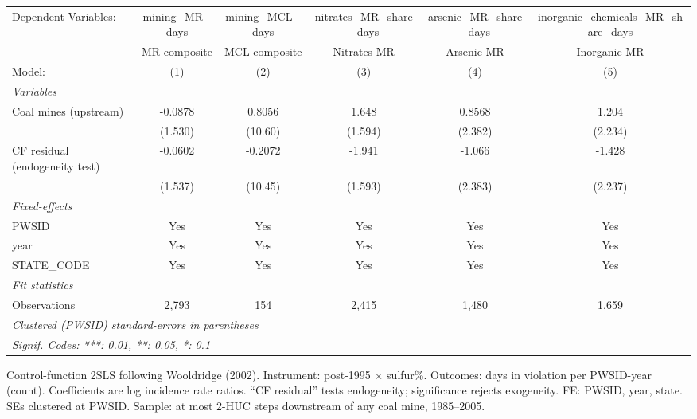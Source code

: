 
\begingroup
\centering
\begin{tabular}{lccccc}
   \tabularnewline \midrule \midrule
   Dependent Variables:           & mining\_MR\_days   & mining\_MCL\_days   & nitrates\_MR\_share\_days    & arsenic\_MR\_share\_days    & inorganic\_chemicals\_MR\_share\_days\\      
                                  & MR composite       & MCL composite       & Nitrates MR                  & Arsenic MR                  & Inorganic MR \\   
   Model:                         & (1)                & (2)                 & (3)                          & (4)                         & (5)\\  
   \midrule
   \emph{Variables}\\
   Coal mines (upstream)          & -0.0878            & 0.8056              & 1.648                        & 0.8568                      & 1.204\\   
                                  & (1.530)            & (10.60)             & (1.594)                      & (2.382)                     & (2.234)\\   
   CF residual (endogeneity test) & -0.0602            & -0.2072             & -1.941                       & -1.066                      & -1.428\\   
                                  & (1.537)            & (10.45)             & (1.593)                      & (2.383)                     & (2.237)\\   
   \midrule
   \emph{Fixed-effects}\\
   PWSID                          & Yes                & Yes                 & Yes                          & Yes                         & Yes\\  
   year                           & Yes                & Yes                 & Yes                          & Yes                         & Yes\\  
   STATE\_CODE                    & Yes                & Yes                 & Yes                          & Yes                         & Yes\\  
   \midrule
   \emph{Fit statistics}\\
   Observations                   & 2,793              & 154                 & 2,415                        & 1,480                       & 1,659\\  
   \midrule \midrule
   \multicolumn{6}{l}{\emph{Clustered (PWSID) standard-errors in parentheses}}\\
   \multicolumn{6}{l}{\emph{Signif. Codes: ***: 0.01, **: 0.05, *: 0.1}}\\
\end{tabular}
 
\par \raggedright 
Control-function 2SLS following Wooldridge (2002). Instrument: post-1995 $\times$ sulfur\%. Outcomes: days in violation per PWSID-year (count). Coefficients are log incidence rate ratios. ``CF residual'' tests endogeneity; significance rejects exogeneity. FE: PWSID, year, state. SEs clustered at PWSID. Sample: at most 2-HUC steps downstream of any coal mine, 1985--2005.
\par\endgroup


